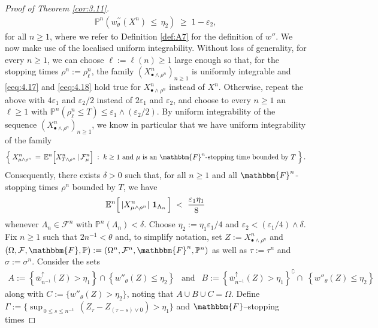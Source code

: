 \documentclass[11pt]{article}
\theoremstyle{definition}\newtheorem{example}[theorem]{Example}
\theoremstyle{definition}\newtheorem{counterexample}[theorem]{Counterexample}
\theoremstyle{definition}\newtheorem{remark}[theorem]{Remark}
\theoremstyle{definition}\newtheorem{defi}[theorem]{Definition}
\numberwithin{equation}{section}
\newcommand{\E}{\mathbb{E}}											%
\newcommand{\Pro}{\mathbb{P}}										%
\newcommand{\ind}{\operatorname{\mathbf{1}}}							%
\renewcommand{\|}{\; : \, \;}											%
\begin{document}
\begin{proof}[Proof of Theorem \ref{cor:3.11}]
	\begin{align} \Pro^{n} \left( w^{\prime \prime}_{\theta}(X^{n}) \, \le \, \eta_2 \right) \; \ge \; 1-\varepsilon_2, \label{eeq:4.18}\end{align}
	for all $n\ge 1$, where we refer to Definition \ref{def:A7} for the definition of $w''$. We now make use of the localised uniform integrability. Without loss of generality, for every $n\ge 1$, we can choose $\ell:=\ell(n)\ge 1$ large enough so that, for the stopping times $\rho^n:=\rho^n_\ell$, the family $(X^n_{\bullet \wedge \rho^n})_{n\ge 1}$ is uniformly integrable and \eqref{eeq:4.17} and \eqref{eeq:4.18} hold true for $X^n_{\bullet \wedge \rho^n}$ instead of $X^n$. Otherwise, repeat the above with $4\varepsilon_1$ and $\varepsilon_2/2$ instead of $2\varepsilon_1$ and $\varepsilon_2$, and choose to every $n\ge 1$ an $\ell \ge 1$ with $\Pro^n(\rho^n_\ell\le T) \le \varepsilon_1 \wedge (\varepsilon_2/2)$. By uniform integrability of the sequence $(X^n_{\bullet \wedge \rho^n})_{n\ge 1}$, we know in particular that we have uniform integrability of the family 
	$$ \left\{ \; X^{n}_{\mu \wedge \rho^n} \,= \, \E^{n}\Bigl[X^{n}_{T\wedge \rho^n} \,| \, \mathcal{F}^{n}_\mu \Bigr]  \; : \; k \ge 1 \text{ and } \mu \text{ is an $\mathbbm{F}^{n}$-stopping time bounded by $T$} \; \right\} .$$
	Consequently, there exists $\delta>0$ such that, for all $n \ge 1$ and all $\mathbbm{F}^{n}$-stopping times $\rho^n$ bounded by $T$, we have 
	\begin{align} 
		\E^{n}  \Bigl[ \, |X^{n}_{\mu\wedge \rho^n}| \, \ind_{\Lambda_n} \, \Bigr] \; < \; \frac{\varepsilon_1\eta_1}{8} \label{eeq:4.19unifint}
	\end{align}
	whenever $\Lambda_n \in \mathcal{F}^{n}$ with $\Pro^{n}(\Lambda_n) < \delta$. Choose $\eta_2:=\eta_1 \varepsilon_1/4$ and $\varepsilon_2<(\varepsilon_1/4) \wedge \delta$. Fix $n\ge 1$ such that $2n^{-1}< \theta$ and, to simplify notation, set $Z:=X^n_{\bullet \wedge \rho^n}$ and $(\Omega,\mathcal{F},\mathbbm{F},\Pro):=(\Omega^n,\mathcal{F}^n,\mathbbm{F}^n,\Pro^n)$ as well as $\tau:=\tau^n$ and $\sigma:=\sigma^n$. Consider the sets 
	\begin{align*} 
		A:= \left\{ \bar w^{\uparrow}_{n^{-1}}(Z) > \eta_1 \right\} \cap \left\{w''_{\theta}(Z) \le  \eta_2 \right\} \;\, \text{ and } \;\,
		B :=  \left\{ \bar w^{\uparrow}_{n^{-1}}(Z) > \eta_1\right\}^\complement \cap \; \left\{w''_{ \theta}(Z)  \le \eta_2 \right\}
	\end{align*}
	along with $C:= \{w''_{\theta}(Z) >  \eta_2 \}$, noting that $A\cup B\cup C=\Omega$. Define $\Gamma :=\{\operatorname{sup}_{\, 0\le s \le n^{-1}} \, (Z_{\tau}-Z_{(\tau-s)\vee 0}) >  \eta_1\}$ and $\mathbbm{F}$--stopping times  

\end{proof}
\end{document}
